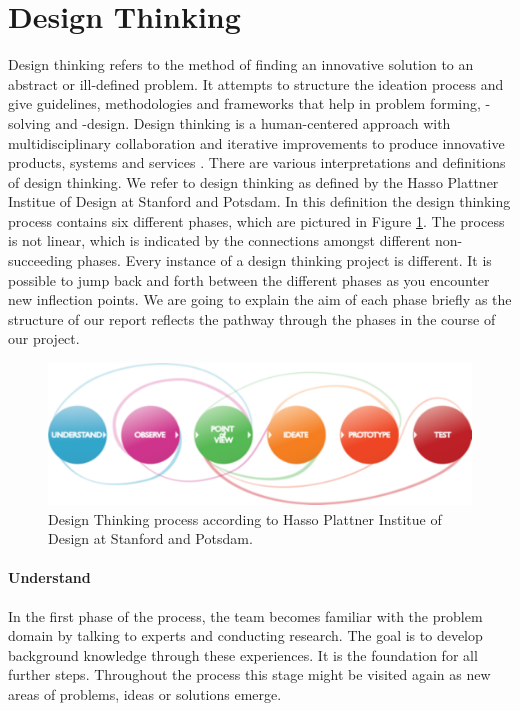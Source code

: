 
\section{Design Thinking}
\label{sec:DESIGN_THINKING}

Design thinking refers to the method of finding an innovative solution to an abstract or ill-defined problem. It attempts to structure the ideation process and give guidelines, methodologies and frameworks that help in problem forming, -solving and -design. Design thinking is a human-centered approach with multidisciplinary collaboration and iterative improvements to produce innovative products, systems and services \cite{design_thinking_book}. There are various interpretations and definitions of design thinking. We refer to design thinking as defined by the Hasso Plattner Institue of Design at Stanford and Potsdam. In this definition the design thinking process contains six different phases, which are pictured in Figure \ref{fig:design_thinking_process}. The process is not linear, which is indicated by the connections amongst different non-succeeding phases. Every instance of a design thinking project is different. It is possible to jump back and forth between the different phases as you encounter new inflection points. We are going to explain the aim of each phase briefly as the structure of our report reflects the pathway through the phases in the course of our project.

\begin{figure}
    \includegraphics[width=\linewidth]{images/design_thinking_process}
    \caption{Design Thinking process according to Hasso Plattner Institue of Design at Stanford and Potsdam.}
    \label{fig:design_thinking_process}
\end{figure}

\paragraph{Understand}
In the first phase of the process, the team becomes familiar with the problem domain by talking to experts and conducting research. The goal is to develop background knowledge through these experiences. It is the foundation for all further steps. Throughout the process this stage might be visited again as new areas of problems, ideas or solutions emerge.

